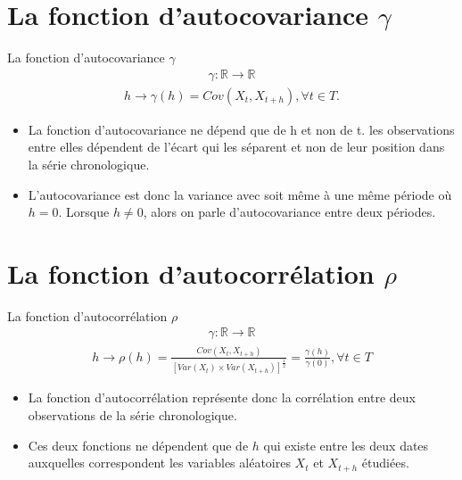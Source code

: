 \documentclass{beamer}
\begin{document}
\section{La fonction d’autocovariance $\gamma$}
\frame{\tableofcontents[current]}

\begin{frame}{La fonction d’autocovariance $\gamma$}
\begin{align*}
\gamma: \mathbb{R} \rightarrow \mathbb{R}
\end{align*}
\begin{align*}
h \rightarrow \gamma (h)=Cov(X_t,X_{t+h}), \forall t \in T.
\end{align*}
\begin{itemize}
\item La fonction d’autocovariance ne dépend que de h et non de t. les observations entre elles dépendent de l’écart qui les séparent et non de leur position dans la série chronologique. 
\item L’autocovariance est donc la variance avec soit même à une même période où $h=0$. Lorsque $h \neq 0$, alors on parle d’autocovariance entre deux périodes. 
\end{itemize}
\end{frame}

\section{La fonction d’autocorrélation $\rho$}
\frame{\tableofcontents[current]}

\begin{frame}{La fonction d’autocorrélation $\rho$}
\begin{align*}
\gamma: \mathbb{R} \rightarrow \mathbb{R}
\end{align*}
\begin{align*}
h \rightarrow \rho (h) = \frac{Cov(X_t,X_{t+h})}{[Var(X_t) \times Var(X_{t+h})]^{\frac{1}{2}}}=\frac{\gamma (h)}{\gamma (0)}, \forall t \in T
\end{align*}
\begin{itemize}
\item La fonction d’autocorrélation représente donc la corrélation entre deux observations de la série chronologique. 
\item Ces deux fonctions ne dépendent que de $h$ qui existe entre les deux dates auxquelles correspondent les variables aléatoires $X_t$  et $X_{t+h}$ étudiées. 
\end{itemize}
\end{frame}
\end{document}
